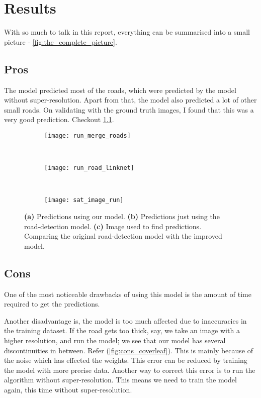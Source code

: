 \chapter{Results}\label{chapt:results}

With so much to talk in this report, everything can be summarised into a small picture - \cref{fig:the_complete_picture}.

\section{Pros}
The model predicted most of the roads, which were predicted by the model without super-resolution. Apart from that, the model also predicted a lot of other small roads. On validating with the ground truth images, I found that this was a very good prediction. Checkout \cref{fig:run_merge_road_maps}.

\begin{figure}[h!]
  \centering
  \begin{subfigure}{0.55\textwidth}
    \texttt{[image: run\_merge\_roads]}
    \caption{}
  \end{subfigure}~
  \begin{subfigure}{0.21\textwidth}
    \texttt{[image: run\_road\_linknet]}
    \caption{}
  \end{subfigure}~
  \begin{subfigure}{0.21\textwidth}
    \texttt{[image: sat\_image\_run]}
    \caption{}
  \end{subfigure}
  \caption[Predictions]{\textbf{(a)} Predictions using our model. \textbf{(b)} Predictions just using the road-detection model. \textbf{(c)} Image used to find predictions. Comparing the original road-detection model with the improved model.}
  \label{fig:run_merge_road_maps}
\end{figure}


\section{Cons}
One of the most noticeable drawbacks of using this model is the amount of time required to get the predictions. 

Another disadvantage is, the model is too much affected due to inaccuracies in the training dataset. If the road gets too thick, say, we take an image with a higher resolution, and run the model; we see that our model has several discontinuities in between. Refer (\cref{fig:cons_coverleaf}). This is mainly because of the noise which has effected the weights. This error can be reduced by training the model with more precise data. Another way to correct this error is to run the algorithm without super-resolution. This means we need to train the model again, this time without super-resolution.

